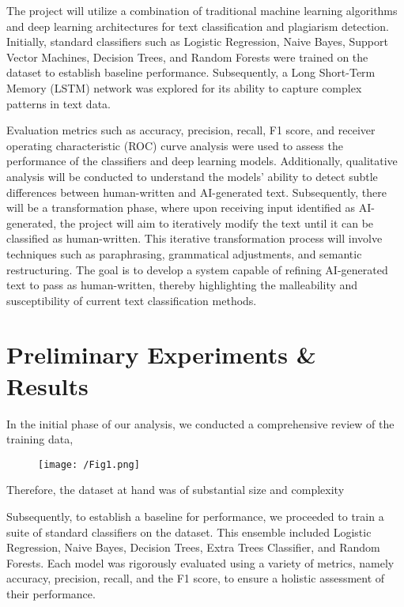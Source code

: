 \documentclass[11pt,a4paper]{article}
\begin{document}
The project will utilize a combination of traditional machine learning algorithms and deep learning architectures for text classification and plagiarism detection. Initially, standard classifiers such as Logistic Regression, Naive Bayes, Support Vector Machines, Decision Trees, and Random Forests were trained on the dataset to establish baseline performance. Subsequently, a Long Short-Term Memory (LSTM) network was explored for its ability to capture complex patterns in text data. 

Evaluation metrics such as accuracy, precision, recall, F1 score, and receiver operating characteristic (ROC) curve analysis were used to assess the performance of the classifiers and deep learning models. Additionally, qualitative analysis will be conducted to understand the models' ability to detect subtle differences between human-written and AI-generated text. Subsequently, there will be a transformation phase, where upon receiving input identified as AI-generated, the project will aim to iteratively modify the text until it can be classified as human-written. This iterative transformation process will involve techniques such as paraphrasing, grammatical adjustments, and semantic restructuring. The goal is to develop a system capable of refining AI-generated text to pass as human-written, thereby highlighting the malleability and susceptibility of current text classification methods. 


\section{Preliminary Experiments & Results}

In the initial phase of our analysis, we conducted a comprehensive review of the training data,  

\begin{figure}[htbp]
  \centering
  \texttt{[image: /Fig1.png]}
\end{figure}

Therefore, the dataset at hand was of substantial size and complexity  

 
Subsequently, to establish a baseline for performance, we proceeded to train a suite of standard classifiers on the dataset. This ensemble included Logistic Regression, Naive Bayes, Decision Trees, Extra Trees Classifier, and Random Forests. Each model was rigorously evaluated using a variety of metrics, namely accuracy, precision, recall, and the F1 score, to ensure a holistic assessment of their performance. 
\end{document}
